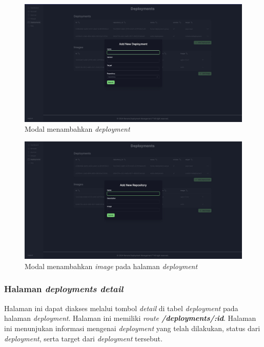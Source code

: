 \begin{figure}[h]
  \centering
  \includegraphics[width=1\textwidth]{resources/chapter-4/dashboard/deployment-page-add-deployment.jpg}
  \caption{Modal menambahkan \textit{deployment}}
  \label{fig:halaman-deployment-add-deployment}
\end{figure}

\begin{figure}[h]
  \centering
  \includegraphics[width=1\textwidth]{resources/chapter-4/dashboard/deployment-page-add-repostory.jpg}
  \caption{Modal menambahkan \textit{image} pada halaman \textit{deployment}}
  \label{fig:halaman-deployment-add-repostory}
\end{figure}

\pagebreak

\subsubsection{Halaman \textit{deployments detail}}
Halaman ini dapat diakses melalui tombol \textit{detail} di tabel \textit{deployment} pada halaman \textit{deployment}. Halaman ini memiliki \textit{route \textbf{/deployments/:id}}. Halaman ini menunjukan informasi mengenai \textit{deployment} yang telah dilakukan, status dari \textit{deployment}, serta target dari \textit{deployment} tersebut.

